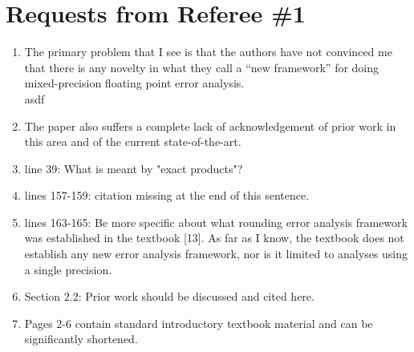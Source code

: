 \documentclass[10pt]{article}
\begin{document}
\section*{Requests from Referee \#1}
\begin{enumerate}\bfseries
	\item The primary problem that I see is that the authors have not convinced me that there is any novelty in what they call a ``new framework'' for doing mixed-precision floating point error analysis.\\
	{\normalfont asdf}
	\item The paper also suffers a complete lack of acknowledgement of prior work in this area and of the current state-of-the-art.
	\item line 39: What is meant by "exact products"? 
	\item lines 157-159: citation missing at the end of this sentence. 
	\item lines 163-165: Be more specific about what rounding error analysis framework was established in the textbook [13]. As far as I know, the textbook does not establish any new error analysis framework, nor is it limited to analyses using a single precision. 
	\item Section 2.2: Prior work should be discussed and cited here. 
	\item Pages 2-6 contain standard introductory textbook material and can be significantly shortened. 
\end{enumerate}
\end{document}
